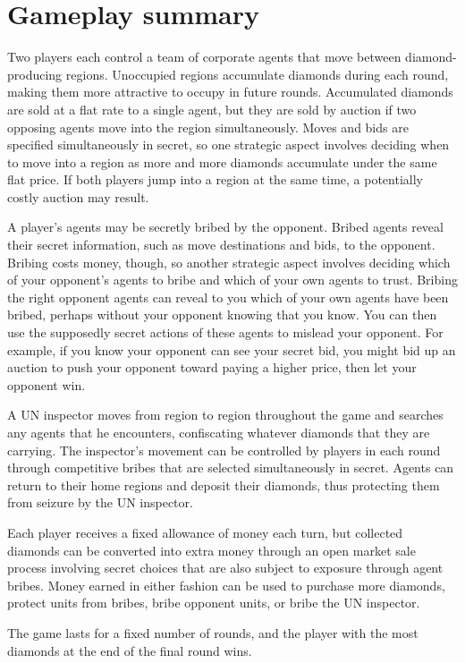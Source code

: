 \documentclass[12pt]{article}
\begin{document}
\section{Gameplay summary}

Two players each control a team of corporate agents that move between diamond-producing regions.  Unoccupied regions accumulate diamonds during each round, making them more attractive to occupy in future rounds.  Accumulated diamonds are sold at a flat rate to a single agent, but they are sold by auction if two opposing agents move into the region simultaneously.  Moves and bids are specified simultaneously in secret, so one strategic aspect involves deciding when to move into a region as more and more diamonds accumulate under the same flat price.  If both players jump into a region at the same time, a potentially costly auction may result.

A player's agents may be secretly bribed by the opponent.  Bribed agents reveal their secret information, such as move destinations and bids, to the opponent.  Bribing costs money, though, so another strategic aspect involves deciding which of your opponent's agents to bribe and which of your own agents to trust.  Bribing the right opponent agents can reveal to you which of your own agents have been bribed, perhaps without your opponent knowing that you know.  You can then use the supposedly secret actions of these agents to mislead your opponent.  For example, if you know your opponent can see your secret bid, you might bid up an auction to push your opponent toward paying a higher price, then let your opponent win.

A UN inspector moves from region to region throughout the game and searches any agents that he encounters, confiscating whatever diamonds that they are carrying.  The inspector's movement can be controlled by players in each round through competitive bribes that are selected simultaneously in secret.  Agents can return to their home regions and deposit their diamonds, thus protecting them from seizure by the UN inspector.

Each player receives a fixed allowance of money each turn, but collected diamonds can be converted into extra money through an open market sale process involving secret choices that are also subject to exposure through agent bribes.  Money earned in either fashion can be used to purchase more diamonds, protect units from bribes, bribe opponent units, or bribe the UN inspector.  


The game lasts for a fixed number of rounds, and the player with the most diamonds at the end of the final round wins.
\end{document}
